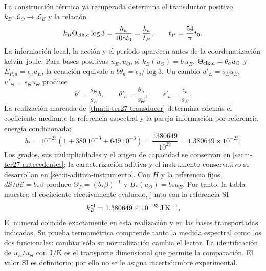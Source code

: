 La construcción térmica ya recuperada determina el transductor positivo
\(k_B:\mathcal L_\Theta\to\mathcal L_E\) y la relación
\begin{equation}
 k_B\Theta_{{\rm clk},a}\log3
 =\frac{h_a}{108t_0}=\frac{\hbar_a}{t_P},
 \qquad t_P=\frac{54}{\pi}t_0.
 \label{eq:ii-kb-comparacion}
\end{equation}
La información local, la acción y el período aparecen antes de la coordenatización
kelvin--joule. Para bases positivas \(u_E,u_\Theta\), si
\(k_B(u_\Theta)=b\,u_E\),
\(\Theta_{{\rm clk},a}=\theta_a u_\Theta\) y
\(E_{P,a}=\epsilon_a u_E\), la ecuación equivale a
\(b\theta_a=\epsilon_a/\log3\). Un cambio
\(u'_E=s_Eu_E\), \(u'_\Theta=s_\Theta u_\Theta\) produce
\[
 b'=\frac{s_\Theta}{s_E}b,\qquad
 \theta'_a=\frac{\theta_a}{s_\Theta},\qquad
 \epsilon'_a=\frac{\epsilon_a}{s_E}.
\]
La realización marcada de \ref{thm:ii-ter27-transducer} determina
además el coeficiente mediante la referencia espectral y la pareja
información por referencia--energía condicionada:
\begin{equation}
 b_*=10^{-23}\left(1+380\,10^{-3}+649\,10^{-6}\right)
     =\frac{1380649}{10^{29}}=1.380649\times10^{-23}.
 \label{eq:ii-b-evaluacion-comparada}
\end{equation}
Los grados, sus multiplicidades y el origen de capacidad se conservan
en \ref{sec:ii-ter27-antecedentes}; la caracterización aditiva y el
instrumento conservativo se desarrollan en
\ref{sec:ii-aditiva-instrumento}. Con $H$ y la referencia fijos,
$d\mathcal S/d\mathcal E=b_*\beta$ produce
$\Theta_P=(b_*\beta)^{-1}$ y $B_*(u_\Theta)=b_*u_E$.
Por tanto, la tabla muestra el coeficiente efectivamente evaluado,
junto con la referencia SI
\[
 k_B^{\rm SI}=1.380649\times10^{-23}\,\mathrm{J\,K^{-1}},
\]
El numeral coincide exactamente en esta realización y en las bases
transportadas indicadas. Su prueba termométrica comprende tanto la medida
espectral como los dos funcionales: cambiar sólo su normalización cambia
el lector. La identificación de $u_E/u_\Theta$ con $\mathrm{J/K}$ es
el transporte dimensional que permite la comparación. El valor SI es
definitorio; por ello no se le asigna incertidumbre experimental.

